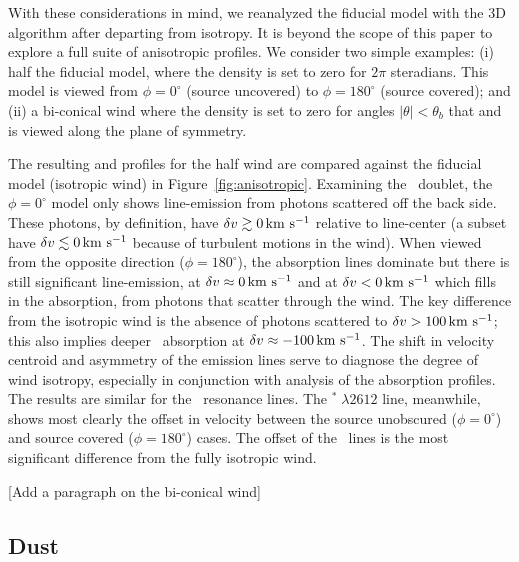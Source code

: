 \documentclass[12pt,preprint]{aastex}
\begin{document}
With these considerations in mind, we reanalyzed the fiducial model
with the 3D algorithm after departing from isotropy.  It is beyond the
scope of this paper to explore a full suite of anisotropic profiles.
We consider two simple examples: (i) half the fiducial model, where 
the density is set to zero for $2\pi$ steradians.  This model is
viewed from $\phi = 0^\circ$ (source uncovered) 
to $\phi = 180^\circ$ (source covered); and 
(ii) a bi-conical wind where the density is set to zero for angles
$|\theta| < \theta_b$ that and is viewed along the plane of symmetry.

The resulting  and
 profiles for the half wind are compared against the fiducial model
(isotropic wind) in Figure~\ref{fig:anisotropic}.  
Examining the \mgiid\ doublet, 
the $\phi = 0^\circ$ model only shows
line-emission from photons scattered
off the back side.  These photons, by definition, have $\delta v \gtrsim 0 \, {\rm km~s^{-1}}$
relative to line-center (a subset have $\delta v \lesssim 0 \, {\rm km~s^{-1}}$ because
of turbulent motions in the wind). 
When viewed from the opposite direction ($\phi = 180^\circ$), the
absorption lines dominate but there is still significant
line-emission, at $\delta v \approx 0 \, {\rm km~s^{-1}}$ and at $\delta v < 0 \, {\rm km~s^{-1}}$ which fills
in the absorption, from photons that scatter through the wind.  The
key difference from the isotropic wind is the absence of photons
scattered to $\delta v > 100 \, {\rm km~s^{-1}}$;  this also implies deeper 
\mgiib\ absorption at $\delta v \approx -100 \, {\rm km~s^{-1}}$. The 
shift in velocity centroid and asymmetry of the emission lines
serve to diagnose the degree of wind isotropy, especially in
conjunction with analysis of the absorption profiles. 
The results are similar for the \feiid\ resonance lines.  The
$^* \; \lambda 2612$ line, meanwhile, shows most clearly the
offset in velocity between the source unobscured ($\phi = 0^\circ$)
and source covered ($\phi = 180^\circ$) cases.  The offset of the
\feiis\ lines is the most significant 
difference from the fully isotropic wind.

[Add a paragraph on the bi-conical wind]

\subsection{Dust}
\label{sec:dust}
\end{document}
